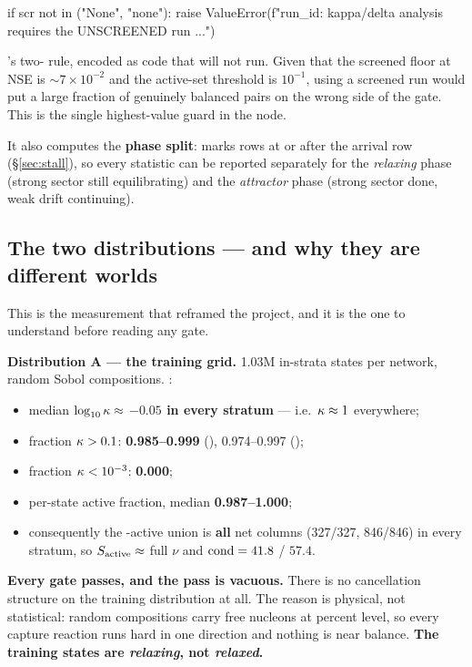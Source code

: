 \begin{srclisting}
if scr not in ("None", "none"):
    raise ValueError(f"{run_id}: kappa/delta analysis requires the UNSCREENED run ...")
\end{srclisting}

's two-\kap{} rule, encoded as code that will not run. Given
that the screened \kap{} floor at NSE is ${\sim}7\times10^{-2}$ and the
active-set threshold is $10^{-1}$, using a screened run would put a large
fraction of genuinely balanced pairs on the wrong side of the gate. This is the
single highest-value guard in the node.

It also computes the \textbf{phase split}:  marks rows at or
after the  arrival row (\S\ref{sec:stall}), so every
statistic can be reported separately for the \emph{relaxing} phase (strong
sector still equilibrating) and the \emph{attractor} phase (strong sector done,
weak drift continuing).

\subsection{The two distributions --- and why they are different worlds}
\label{sec:twodistributions}

This is the measurement that reframed the project, and it is the one to
understand before reading any gate.

\textbf{Distribution A --- the training grid.} 1.03M in-strata states per
network, random Sobol compositions. :

\begin{itemize}
\item median $\log_{10}\kappa \approx$ \textbf{$-0.05$ in every stratum} --- i.e.\
  $\kappa \approx 1$ everywhere;
\item fraction $\kappa > 0.1$: \textbf{0.985--0.999} (), 0.974--0.997
  (\msn{151});
\item fraction $\kappa < 10^{-3}$: \textbf{0.000};
\item per-state active fraction, median \textbf{0.987--1.000};
\item consequently the \kap-active union is \textbf{all} net columns (327/327,
  846/846) in every stratum, so $S_{\mathrm{active}} \approx$ full $\nu$ and
  $\operatorname{cond} = 41.8$ / $57.4$.
\end{itemize}

\textbf{Every gate passes, and the pass is vacuous.} There is no cancellation
structure on the training distribution at all. The reason is physical, not
statistical: random compositions carry free nucleons at percent level, so every
capture reaction runs hard in one direction and nothing is near balance.
\textbf{The training states are \emph{relaxing}, not \emph{relaxed}.}

